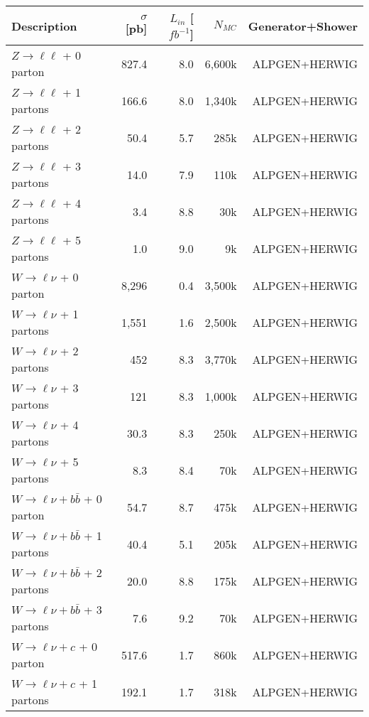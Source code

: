\begin{table}[phtdp]
\begin{center}
\begin{tabular}{lrrrr}
\hline
Description         & $\sigma$ [pb]  & $L_{in}$ [$fb^{-1}$] &  $N_{MC}$& Generator+Shower \\[1mm]
\hline \hline
$Z\to \ell\ell$ + 0 parton   & 827.4  &  8.0          &  6,600k & ALPGEN+HERWIG \\[1mm]     
$Z\to \ell\ell$ + 1 partons  & 166.6  &  8.0          &  1,340k & ALPGEN+HERWIG \\[1mm]     
$Z\to \ell\ell$ + 2 partons  & 50.4   &  5.7          &    285k & ALPGEN+HERWIG \\[1mm]     
$Z\to \ell\ell$ + 3 partons  & 14.0   &  7.9          &    110k & ALPGEN+HERWIG \\[1mm]  
$Z\to \ell\ell$ + 4 partons  & 3.4    &  8.8          &     30k & ALPGEN+HERWIG \\[1mm]  
$Z\to \ell\ell$ + 5 partons  & 1.0    &  9.0          &     9k & ALPGEN+HERWIG \\[1mm]  
\hline
$W\to \ell\nu$ + 0 parton   & 8,296   &  0.4         &  3,500k & ALPGEN+HERWIG \\[1mm]     
$W\to \ell\nu$ + 1 partons  & 1,551   &  1.6         &  2,500k & ALPGEN+HERWIG \\[1mm]     
$W\to \ell\nu$ + 2 partons  &   452   &  8.3         &  3,770k & ALPGEN+HERWIG \\[1mm]     
$W\to \ell\nu$ + 3 partons  &   121   &  8.3         &  1,000k & ALPGEN+HERWIG \\[1mm]  
$W\to \ell\nu$ + 4 partons  &  30.3   &  8.3         &    250k & ALPGEN+HERWIG \\[1mm]  
$W\to \ell\nu$ + 5 partons  &   8.3   &  8.4         &     70k & ALPGEN+HERWIG \\[1mm]  
\hline
$W\to \ell\nu+b\bar{b}$ + 0 parton   & 54.7  &  8.7  &    475k & ALPGEN+HERWIG \\[1mm]     
$W\to \ell\nu+b\bar{b}$ + 1 partons  & 40.4  &  5.1  &    205k & ALPGEN+HERWIG \\[1mm]     
$W\to \ell\nu+b\bar{b}$ + 2 partons  & 20.0  &  8.8  &    175k & ALPGEN+HERWIG \\[1mm]     
$W\to \ell\nu+b\bar{b}$ + 3 partons  & 7.6   &  9.2  &     70k & ALPGEN+HERWIG \\[1mm] \hline
\hline
$W\to \ell\nu+c$ + 0 parton   & 517.6 &  1.7   &  860k & ALPGEN+HERWIG \\[1mm]     
$W\to \ell\nu+c$ + 1 partons  & 192.1 &  1.7   &  318k & ALPGEN+HERWIG \\[1mm]     

\end{tabular}
\end{center}
\end{table}
